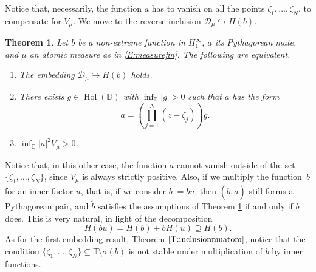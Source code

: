 \documentclass[12pt]{amsart}
\newtheorem{theorem2}{Theorem}
\theoremstyle{definition}
\theoremstyle{remark}
\theoremstyle{remark}
\begin{document}
Notice that, necessarily, the function $a$ has to vanish on all the points $\zeta_1,\ldots,\zeta_N$, to compensate for $V_\mu$. We move to the reverse inclusion $\mathcal{D}_\mu \hookrightarrow H(b)$.  
 \begin{theorem2} \label{T:rev-emb}
     Let $b$ be a non-extreme function in $H^\infty_1$, $a$ its Pythagorean mate, and $\mu$ an atomic measure as in \eqref{E:measurefin}. The following are equivalent.
     \begin{enumerate}[label={\rm (\Alph*)}]
         \item \label{T:rev-emb1} The embedding $\mathcal{D}_\mu\hookrightarrow H(b)$ holds.
          \item \label{T:rev-emb4} There exists $g\in \operatorname{Hol}(\mathbb{D})$ with $\inf_\mathbb{D}|g|>0$ such that $a$ has the form 
         \begin{equation*}
             a=\left(\prod_{j=1}^N (z-\zeta_j)\right) g.
         \end{equation*}
         \item \label{T:rev-emb2}  $\inf_{\mathbb{D}} |a|^2 V_\mu >0$.
     \end{enumerate}
 \end{theorem2}

Notice that, in this other case, the function $a$ cannot vanish outside of the set $\{ \zeta_1, \ldots, \zeta_N\}$, since $V_\mu$ is always strictly positive. Also, if we  multiply the function~$b$ for an inner factor $u$, that is, if we consider $\tilde{b}:=bu$, then $(\tilde{b},a)$ still forms a Pythagorean pair, and $\tilde{b}$ satisfies the assumptions of Theorem \ref{T:rev-emb} if and only if $b$ does. This is very natural, in light of the decomposition \cite[Theorem 18.7]{hb2}
\[
  H(bu)=H(b)+bH(u) \supseteq H(b).
\] As for the first embedding result, Theorem $\ref{T:inclusionmuatom}$, notice that the condition $\{\zeta_1,\ldots,\zeta_N\}\subseteq\mathbb{T}\setminus\sigma(b)$ is not stable under multiplication of $b$ by inner functions. 
\end{document}
